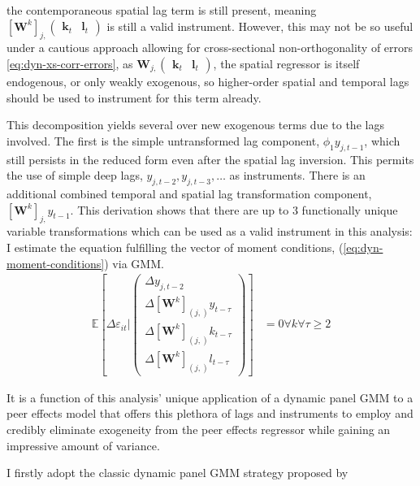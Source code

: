 the contemporaneous spatial lag term is still present,
meaning $[\mathbf W^k]_{j,} \begin{pmatrix}\mathbf k_t & \mathbf l_t\end{pmatrix}$
is still a valid instrument.
However, this may not be so useful under a cautious approach
allowing for cross-sectional non-orthogonality of errors \eqref{eq:dyn-xs-corr-errors},
as $\mathbf W_{j,} \begin{pmatrix}\mathbf k_t & \mathbf l_t\end{pmatrix}$,
the spatial  regressor is itself endogenous, or only weakly exogenous,
so higher-order spatial and temporal lags should be used to instrument for this term already.
\par
This decomposition yields several over new exogenous terms due to the lags involved.
The first is the simple untransformed lag component, $\phi_1 y_{j,t-1}$,
which still persists in the reduced form even after the spatial lag inversion.
This permits the use of simple deep lags, $y_{j,t-2}, y_{j,t-3},\dots$ as instruments.
There is an additional combined temporal and spatial lag transformation component,
$[\mathbf W^k]_{j,}y_{t-1}$.
This derivation shows that there are up to 3 functionally unique variable transformations
which can be used as a valid instrument in this analysis:
I estimate the equation fulfilling the vector of moment conditions,
(\ref{eq:dyn-moment-conditions}) via GMM.
\begin{align}
    \label{eq:dyn-moment-conditions}
    \mathbb E[
        \Delta\varepsilon_{it}
        \vert
        \begin{pmatrix}
            \Delta y_{j,t-2}                    \\
            \Delta [\mathbf W^k]_{(j,)}y_{t-\tau}    \\
            \Delta [\mathbf W^k]_{(j,)}k_{t-\tau}    \\
            \Delta [\mathbf W^k]_{(j,)}l_{t-\tau}
        \end{pmatrix}
    ]
    &= 0 \forall k \forall \tau\geq 2
\end{align}
\par
It is a function of this analysis' unique application of a dynamic panel GMM
to a peer effects model that offers this plethora of lags and instruments
to employ and credibly eliminate exogeneity from the peer effects 
regressor while gaining an impressive amount of variance.
\par
I firstly adopt the classic dynamic panel GMM strategy proposed by \cite{Anderson1981}
